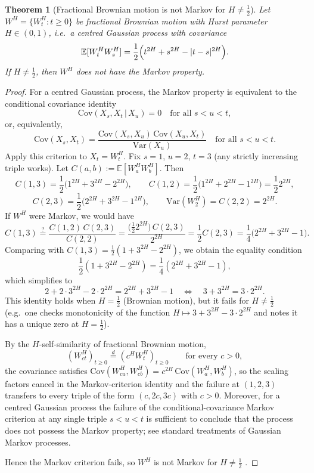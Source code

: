 \documentclass[12pt,a4paper]{article}
\theoremstyle{definition}
\theoremstyle{plain}
\newtheorem{theorem}{Theorem}[section]
\theoremstyle{remark}
\theoremstyle{plain}
\begin{document}
\begin{theorem}[Fractional Brownian motion is not Markov for $H\neq \tfrac{1}{2}$]
\label{thm:fbm_not_markov}
Let $W^H=\{W_t^H:t\ge0\}$ be fractional Brownian motion with Hurst parameter $H\in(0,1)$, i.e.\ a centred Gaussian process with covariance
\[
\mathbb{E}[W_t^H W_s^H] = \frac{1}{2}\Bigl(t^{2H}+s^{2H}-|t-s|^{2H}\Bigr).
\]
If $H\neq \tfrac{1}{2}$, then $W^H$ does not have the Markov property.
\end{theorem}

\begin{proof}
For a centred Gaussian process, the Markov property is equivalent to the conditional covariance identity
\[
\mathrm{Cov}(X_s,X_t\,|\,X_u)=0 \quad \text{for all } s<u<t,
\]
or, equivalently,
\[
\mathrm{Cov}(X_s,X_t) = \frac{\mathrm{Cov}(X_s,X_u)\,\mathrm{Cov}(X_u,X_t)}{\mathrm{Var}(X_u)}
\quad \text{for all } s<u<t.
\]
Apply this criterion to $X_t=W_t^H$. Fix $s=1$, $u=2$, $t=3$ (any strictly increasing triple works).
Let $C(a,b):=\mathbb{E}[W_a^H W_b^H]$.
Then
\[
C(1,3) = \frac{1}{2}\bigl(1^{2H}+3^{2H}-2^{2H}\bigr),
\qquad
C(1,2) = \frac{1}{2}\bigl(1^{2H}+2^{2H}-1^{2H}\bigr)=\frac{1}{2}2^{2H},
\]
\[
C(2,3)=\frac{1}{2}\bigl(2^{2H}+3^{2H}-1^{2H}\bigr),
\qquad
\mathrm{Var}(W_2^H)=C(2,2)=2^{2H}.
\]
If $W^H$ were Markov, we would have
\[
C(1,3) \stackrel{?}{=} \frac{C(1,2)\,C(2,3)}{C(2,2)}
= \frac{\bigl(\frac{1}{2}2^{2H}\bigr)\,C(2,3)}{2^{2H}}=\frac{1}{2}C(2,3)
=\frac{1}{4}\bigl(2^{2H}+3^{2H}-1\bigr).
\]
Comparing with $C(1,3)=\frac{1}{2}(1+3^{2H}-2^{2H})$, we obtain the equality condition
\[
\frac{1}{2}(1+3^{2H}-2^{2H})=\frac{1}{4}(2^{2H}+3^{2H}-1),
\]
which simplifies to
\[
2 + 2\cdot 3^{2H} - 2\cdot 2^{2H} = 2^{2H}+3^{2H}-1
\quad\Longleftrightarrow\quad
3 + 3^{2H} = 3\cdot 2^{2H}.
\]
This identity holds when $H=\tfrac{1}{2}$ (Brownian motion), but it fails for $H\neq\tfrac{1}{2}$ (e.g.\ one checks monotonicity of the function $H\mapsto 3+3^{2H}-3\cdot2^{2H}$ and notes it has a unique zero at $H=\tfrac{1}{2}$).

By the $H$-self-similarity of fractional Brownian motion,
\[
(W^H_{ct})_{t \geq 0} \stackrel{d}{=} (c^H W^H_t)_{t \geq 0} \qquad \text{for every } c > 0,
\]
the covariance satisfies $\mathrm{Cov}(W^H_{ca}, W^H_{cb}) = c^{2H}\,\mathrm{Cov}(W^H_a, W^H_b)$, so the scaling factors cancel in the Markov-criterion identity and the failure at $(1, 2, 3)$ transfers to every triple of the form $(c, 2c, 3c)$ with $c > 0$. Moreover, for a centred Gaussian process the failure of the conditional-covariance Markov criterion at any single triple $s < u < t$ is sufficient to conclude that the process does not possess the Markov property; see standard treatments of Gaussian Markov processes.

Hence the Markov criterion fails, so $W^H$ is not Markov for $H\neq\tfrac{1}{2}$ \cite{GatheralRough}.
\end{proof}
\end{document}
